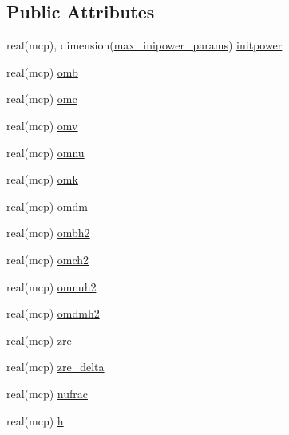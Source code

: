 \subsection*{Public Attributes}
\begin{DoxyCompactItemize}
\item 
real(mcp), dimension(\mbox{\hyperlink{namespacecosmologytypes_a777630dc8c977e6abd38f7a7cc4652b8}{max\+\_\+inipower\+\_\+params}}) \mbox{\hyperlink{structcosmologytypes_1_1cmbparams_a18beb79a3dfcede2bf0eabf4b456243f}{initpower}}
\item 
real(mcp) \mbox{\hyperlink{structcosmologytypes_1_1cmbparams_a5627d48a6b73137732529c48b661ed21}{omb}}
\item 
real(mcp) \mbox{\hyperlink{structcosmologytypes_1_1cmbparams_ab3692feeb129a96e57504d773b1352e1}{omc}}
\item 
real(mcp) \mbox{\hyperlink{structcosmologytypes_1_1cmbparams_a92865fb6e28a8bb92db7072f44c3f77c}{omv}}
\item 
real(mcp) \mbox{\hyperlink{structcosmologytypes_1_1cmbparams_ad29c36480bca5904e5fe2aaef624906e}{omnu}}
\item 
real(mcp) \mbox{\hyperlink{structcosmologytypes_1_1cmbparams_a9a216db454f4ed151914ed9798094b93}{omk}}
\item 
real(mcp) \mbox{\hyperlink{structcosmologytypes_1_1cmbparams_ad6348556149a6bf3be800fbde12540d3}{omdm}}
\item 
real(mcp) \mbox{\hyperlink{structcosmologytypes_1_1cmbparams_a54bfd805d1e32a3394e9b58726a1930c}{ombh2}}
\item 
real(mcp) \mbox{\hyperlink{structcosmologytypes_1_1cmbparams_af1b0c0290bfe6fa6a7d95fb7370c45ef}{omch2}}
\item 
real(mcp) \mbox{\hyperlink{structcosmologytypes_1_1cmbparams_acd6576f8bf7a5281c4115ff8e91c8fef}{omnuh2}}
\item 
real(mcp) \mbox{\hyperlink{structcosmologytypes_1_1cmbparams_a8b1c96a3dfc434bbe9b531ff5cd9b8c7}{omdmh2}}
\item 
real(mcp) \mbox{\hyperlink{structcosmologytypes_1_1cmbparams_a342b1ff2ca8b75d6d3c9173d502e166e}{zre}}
\item 
real(mcp) \mbox{\hyperlink{structcosmologytypes_1_1cmbparams_add6cd5affe2d2ab9b022d5ac2d63a5b4}{zre\+\_\+delta}}
\item 
real(mcp) \mbox{\hyperlink{structcosmologytypes_1_1cmbparams_a14464775b8c881c9ae2a8ad14d4fcbf3}{nufrac}}
\item 
real(mcp) \mbox{\hyperlink{structcosmologytypes_1_1cmbparams_a05a76916ba3c9d30bf75579e5881482c}{h}}

\end{DoxyCompactItemize}
